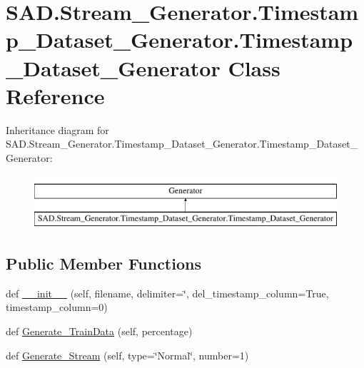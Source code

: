 \hypertarget{classSAD_1_1Stream__Generator_1_1Timestamp__Dataset__Generator_1_1Timestamp__Dataset__Generator}{}\section{S\+A\+D.\+Stream\+\_\+\+Generator.\+Timestamp\+\_\+\+Dataset\+\_\+\+Generator.\+Timestamp\+\_\+\+Dataset\+\_\+\+Generator Class Reference}
\label{classSAD_1_1Stream__Generator_1_1Timestamp__Dataset__Generator_1_1Timestamp__Dataset__Generator}
Inheritance diagram for S\+A\+D.\+Stream\+\_\+\+Generator.\+Timestamp\+\_\+\+Dataset\+\_\+\+Generator.\+Timestamp\+\_\+\+Dataset\+\_\+\+Generator\+:\begin{figure}[H]
\begin{center}
\leavevmode
\includegraphics[height=2.000000cm]{classSAD_1_1Stream__Generator_1_1Timestamp__Dataset__Generator_1_1Timestamp__Dataset__Generator}
\end{center}
\end{figure}
\subsection*{Public Member Functions}
\begin{DoxyCompactItemize}
\item 
def \hyperlink{classSAD_1_1Stream__Generator_1_1Timestamp__Dataset__Generator_1_1Timestamp__Dataset__Generator_a5c48488d2bc6122cddc3f0c68587b820}{\+\_\+\+\_\+init\+\_\+\+\_\+} (self, filename, delimiter=\char`\"{},  del\+\_\+timestamp\+\_\+column=True,  timestamp\+\_\+column=0)
\item 
def \hyperlink{classSAD_1_1Stream__Generator_1_1Timestamp__Dataset__Generator_1_1Timestamp__Dataset__Generator_a90679f7d1b4dab5dbff87b7f44cba086}{Generate\+\_\+\+Train\+Data} (self, percentage)
\item 
def \hyperlink{classSAD_1_1Stream__Generator_1_1Timestamp__Dataset__Generator_1_1Timestamp__Dataset__Generator_ae70570bad46cda549ce8adce51f32b12}{Generate\+\_\+\+Stream} (self, type=\char`\"{}Normal\char`\"{}, number=1)
\end{DoxyCompactItemize}
